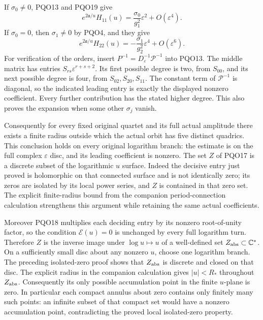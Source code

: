 \documentclass[11pt,a4paper]{article}
\begin{document}
If $\sigma_0\ne0$, PQO13 and PQO19 give
\[
 e^{2\mathfrak a/u}H_{11}(u)
              =\frac{\sigma_0}{g_1^2}\varepsilon^2
                                     +O(\varepsilon^4).
\]
If $\sigma_0=0$, then $\sigma_1\ne0$ by PQO4, and they give
\[
 e^{2\mathfrak a/u}H_{22}(u)
              =-\frac{\sigma_1}{g_2^2}\varepsilon^4
                                     +O(\varepsilon^6).
 \tag{PQO20}
\]
For verification of the orders, insert
$P^{-1}=D_\varepsilon^{-1}\mathscr P^{-1}$ into PQO13.
The middle matrix has entries $S_{rs}\varepsilon^{r+s+2}$.
Its first possible degree is two, from $S_{00}$, and its
next possible degree is four, from $S_{02},S_{20},S_{11}$.
The constant term of $\mathscr P^{-1}$ is diagonal, so the
indicated leading entry is exactly the displayed nonzero
coefficient. Every further contribution has the stated higher
degree. This also proves the expansion when some other
$\sigma_j$ vanish.

Consequently for every fixed original quartet and its full
actual amplitude there exists a finite radius outside which
the actual orbit has five distinct quadrics. This conclusion
holds on every original logarithm branch: the estimate is on
the full complex $\varepsilon$ disc, and its leading coefficient
is nonzero. The set $Z$ of PQO17 is a discrete subset of the
logarithmic $u$ surface. Indeed the decisive entry just proved
is holomorphic on that connected surface and is not identically
zero; its zeros are isolated by its local power series, and
$Z$ is contained in that zero set. The explicit finite-radius
bound from the companion period-connection calculation
strengthens this argument while retaining the same actual
coefficients.

Moreover PQO18 multiplies each deciding entry by its nonzero
root-of-unity factor, so the condition $\mathcal E(u)=0$ is
unchanged by every full logarithm turn. Therefore $Z$ is the
inverse image under $\log u\mapsto u$ of a well-defined set
$Z_{\rm abs}\subset\mathbb C^*$. On a sufficiently small disc
about any nonzero $u$, choose one logarithm branch. The preceding
isolated-zero proof shows that $Z_{\rm abs}$ is discrete and
closed on that disc. The explicit radius in the companion
calculation gives $|u|<R_*$ throughout $Z_{\rm abs}$.
Consequently its only possible accumulation point in the finite
$u$-plane is zero. In particular each compact annulus about
zero contains only finitely many such points: an infinite
subset of that compact set would have a nonzero accumulation
point, contradicting the proved local isolated-zero property.
\end{document}
